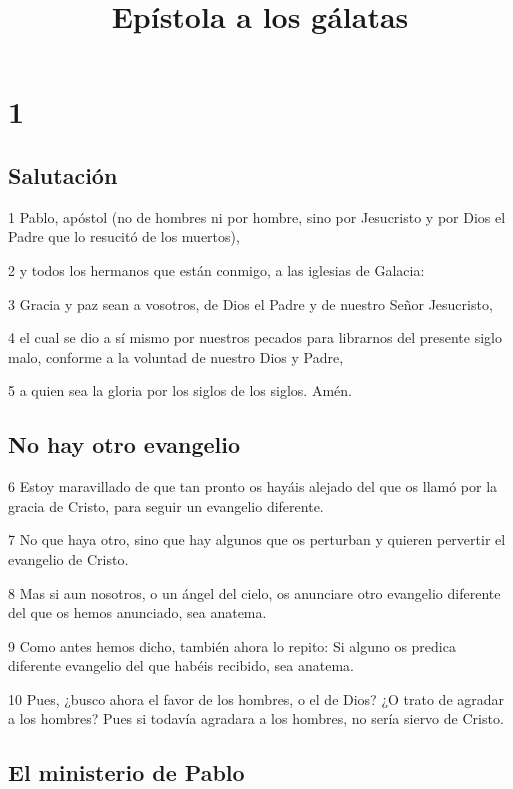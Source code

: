 
\title{Epístola a los gálatas}

\chapter{1}

\section*{Salutación}

\par 1 Pablo, apóstol (no de hombres ni por hombre, sino por Jesucristo y por Dios el Padre que lo resucitó de los muertos),
\par 2 y todos los hermanos que están conmigo, a las iglesias de Galacia:
\par 3 Gracia y paz sean a vosotros, de Dios el Padre y de nuestro Señor Jesucristo,
\par 4 el cual se dio a sí mismo por nuestros pecados para librarnos del presente siglo malo, conforme a la voluntad de nuestro Dios y Padre,
\par 5 a quien sea la gloria por los siglos de los siglos. Amén.

\section*{No hay otro evangelio}

\par 6 Estoy maravillado de que tan pronto os hayáis alejado del que os llamó por la gracia de Cristo, para seguir un evangelio diferente.
\par 7 No que haya otro, sino que hay algunos que os perturban y quieren pervertir el evangelio de Cristo.
\par 8 Mas si aun nosotros, o un ángel del cielo, os anunciare otro evangelio diferente del que os hemos anunciado, sea anatema.
\par 9 Como antes hemos dicho, también ahora lo repito: Si alguno os predica diferente evangelio del que habéis recibido, sea anatema.
\par 10 Pues, ¿busco ahora el favor de los hombres, o el de Dios? ¿O trato de agradar a los hombres? Pues si todavía agradara a los hombres, no sería siervo de Cristo.

\section*{El ministerio de Pablo}

